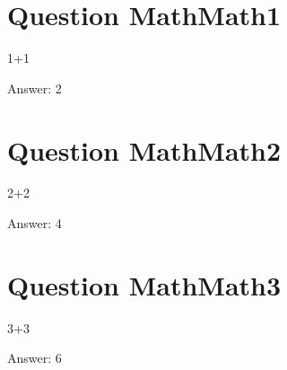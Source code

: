 

\section{Question MathMath1}

1+1

Answer: 2


\section{Question MathMath2}

2+2

Answer: 4


\section{Question MathMath3}

3+3

Answer: 6
